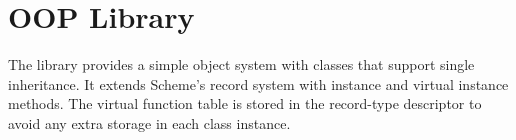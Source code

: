 %
%
%

\newcommand{\nl}[1]{\textsf{\textit{#1}}}

\chapter {OOP Library}\label{chap:oop}

The  library provides a simple object system with classes that support
single inheritance. It extends Scheme's record system with instance and virtual instance
methods. The virtual function table is stored in the record-type descriptor to avoid any
extra storage in each class instance.


